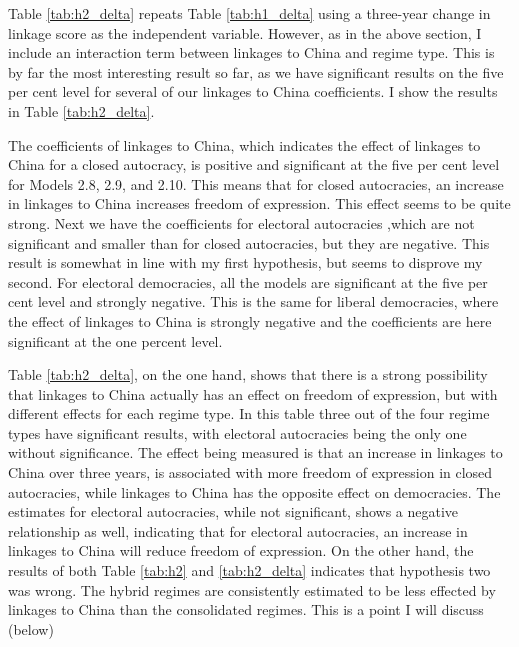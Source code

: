 Table \ref{tab:h2_delta} repeats Table \ref{tab:h1_delta} using a three-year change in linkage score as the independent variable. However, as in the above section, I include an interaction term between linkages to China and regime type. This is by far the most interesting result so far, as we have significant results on the five per cent level for several of our linkages to China coefficients. I show the results in Table \ref{tab:h2_delta}. 

The coefficients of linkages to China, which indicates the effect of linkages to China for a closed autocracy, is positive and significant at the five per cent level for Models 2.8, 2.9, and 2.10. This means that for closed autocracies, an increase in linkages to China increases freedom of expression. This effect seems to be quite strong. Next we have the coefficients for electoral autocracies ,which are not significant and smaller than for closed autocracies, but they are negative. This result is somewhat in line with my first hypothesis, but seems to disprove my second. For electoral democracies, all the models are significant at the five per cent level and strongly negative. This is the same for liberal democracies, where the effect of linkages to China is strongly negative and the coefficients are here significant at the one percent level.

Table \ref{tab:h2_delta}, on the one hand, shows that there is a strong possibility that linkages to China actually has an effect on freedom of expression, but with different effects for each regime type. In this table three out of the four regime types have significant results, with electoral autocracies being the only one without significance. The effect being measured is that an increase in linkages to China over three years, is associated with more freedom of expression in closed autocracies, while linkages to China has the opposite effect on democracies. The estimates for electoral autocracies, while not significant, shows a negative relationship as well, indicating that for electoral autocracies, an increase in linkages to China will reduce freedom of expression. On the other hand, the results of both Table \ref{tab:h2} and \ref{tab:h2_delta} indicates that hypothesis two was wrong. The hybrid regimes are consistently estimated to be less effected by linkages to China than the consolidated regimes. This is a point I will discuss (below)

